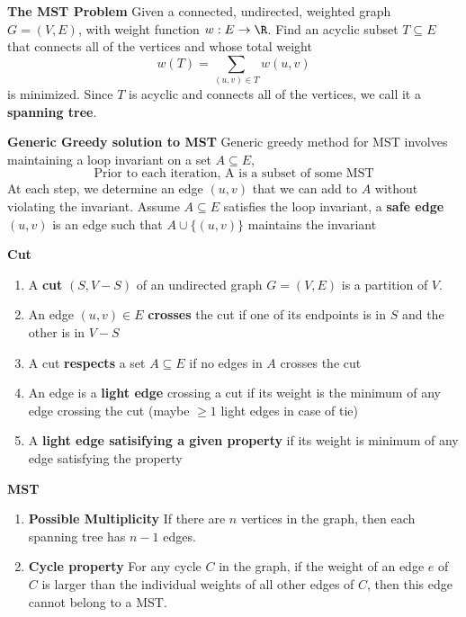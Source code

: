 \documentclass[11pt]{article}
\begin{document}
\begin{defn*}
    \textbf{The MST Problem} Given a connected, undirected, weighted graph $G = (V,E)$, with weight function $w: E\to \R$. Find an acyclic subset $T\subseteq E$ that connects all of the vertices and whose total weight 
    \[
        w(T) = \sum_{(u,v)\in T} w(u,v)
    \]
    is minimized. Since $T$ is acyclic and connects all of the vertices, we call it a \textbf{spanning tree}. 
\end{defn*}
$ $\\
\textbf{Generic Greedy solution to MST}
Generic greedy method for MST involves maintaining a loop invariant on a set $A \subseteq E$, 
\[
    \text{Prior to each iteration, A is a subset of some MST}
\]
At each step, we determine an edge $(u,v)$ that we can add to $A$ without violating the invariant. Assume $A \subseteq E$ satisfies the loop invariant, a \textbf{safe edge} $(u,v)$ is an edge such that $A\cup \{(u,v) \}$ maintains the invariant


\begin{defn*}
    \textbf{Cut} 
    \begin{enumerate}
        \item A \textbf{cut} $(S, V-S)$ of an undirected graph $G = (V,E)$ is a partition of $V$. 
        \item An edge $(u,v) \in E$ \textbf{crosses} the cut if one of its endpoints is in $S$ and the other is in $V - S$
        \item A cut \textbf{respects} a set $A \subseteq E$ if no edges in $A$ crosses the cut 
        \item An edge is a \textbf{light edge} crossing a cut if its weight is the minimum of any edge crossing the cut (maybe $\geq 1$ light edges in case of tie)
        \item A \textbf{light edge satisifying a given property} if its weight is minimum of any edge satisfying the property 
    \end{enumerate}
\end{defn*}


\begin{proposition*}
    \textbf{MST}
    \begin{enumerate}
        \item \textbf{Possible Multiplicity} If there are $n$ vertices in the graph, then each spanning tree has $n − 1$ edges.
        \item \textbf{Cycle property} For any cycle $C$ in the graph, if the weight of an edge $e$ of $C$ is larger than the individual weights of all other edges of $C$, then this edge cannot belong to a MST.
    \end{enumerate}
\end{proposition*}
\end{document}

